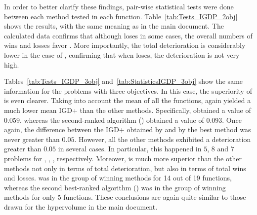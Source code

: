 In order to better clarify these findings, pair-wise statistical tests were done between each method tested in each 
function.
%
Table~\ref{tab:Tests_IGDP_2obj} shows the results, with the same meaning as in the main document.
%
The calculated data confirms that although \VSDMOEA{} loses in some cases, the overall numbers of wins and losses favor \VSDMOEA{}.
%
More importantly, the total deterioration is considerably lower in the case of \VSDMOEA{}, confirming that when \VSDMOEA{} loses, the deterioration is not 
very high.


Tables~\ref{tab:Tests_IGDP_3obj} and~\ref{tab:StatisticsIGDP_3obj} show the same information for the problems with three objectives.
%
In this case, the superiority of \VSDMOEA{} is even clearer.
%
Taking into account the mean of all the functions, \VSDMOEA{} again yielded a much lower mean IGD+ than the other methods.
%
Specifically, \VSDMOEA{} obtained a value of $0.059$, whereas the second-ranked algorithm (\RMOEA{}) obtained a value of $0.093$.
%
Once again, the difference between the IGD+ obtained by \VSDMOEA{} and by the best method was never greater
than $0.05$.
%
However, all the other methods exhibited a deterioration greater than $0.05$ in several cases.
%
In particular, this happened in $5$, $8$ and $7$ problems for \MOEAD{}, \NSGAII{}, \RMOEA{}, respectively.
%
Moreover, \VSDMOEA{} is much more superior than the other methods not only in terms of total deterioration, but also
in terms of total wins and losses.
%
\VSDMOEA{} was in the group of winning methods for 14 out of 19 functions, whereas the second best-ranked algorithm (\RMOEA{})
was in the group of winning methods for only 5 functions.
%
These conclusions are again quite similar to those drawn for the hypervolume in the main document.





